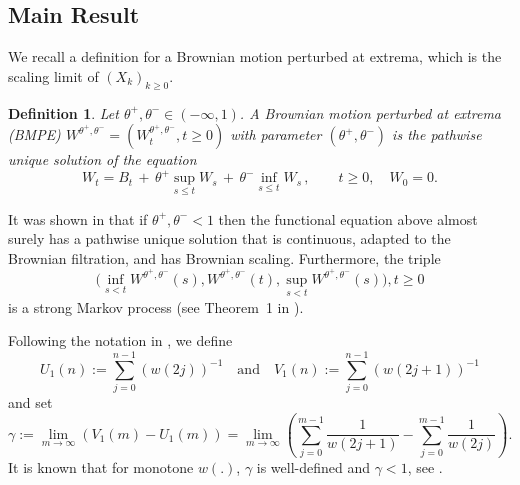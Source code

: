 \documentclass[twoside,12pt, a4paper, final]{article}
\newtheorem{definition}{Definition}[section]
\numberwithin{equation}{section}
\theoremstyle{remark}
\newcommand{\comment}[1]{\textcolor{blue}{(Comment: #1)}}
\begin{document}
	
	
	
	
	\subsection{Main Result}
	We recall a definition for a Brownian motion perturbed at extrema, which is the scaling limit of $(X_k)_{k\geq 0}$.
	\begin{definition}
		\label{defn:BMPE}
		Let $\theta^+, \theta^- \in (- \infty , 1)$. A Brownian motion perturbed at
		extrema (BMPE) $W^{\theta^+, \theta^-} = \left(W^{\theta^+, \theta^-}_t, t\geq 0\right)$ with parameter $(\theta^+, \theta^-)$ is the pathwise unique solution of the equation
		$$
		W_t = B_t \,+\, \theta^+ \sup_{s\leq t} W_s  \,+\, \theta^- \inf_{s\leq t} W_s \,,   \qquad t \ge 0, \quad W_0 = 0.
		$$
	\end{definition}
	It was shown in \cite{PW97, CD99} that if $\theta^+, \theta^- < 1$ then the functional equation above almost surely has a pathwise unique solution that is continuous, adapted to the Brownian filtration, and has Brownian scaling. 
	Furthermore, the triple 
	$${\big(\inf_{s < t} W^{\theta^{+}, \theta^{-}}(s), 
		W^{\theta^{+}, \theta^{-}}(t) , 
		\sup _{s<t} W^{\theta^{+}, \theta^{-}}(s)\big)}, t \geq 0$$ is a strong Markov process (see Theorem~1 in \cite{PW97}).
	
	Following the notation in \cite{T96}, we define
	\[
	U_1(n):=\sum_{j=0}^{n-1}(w(2 j))^{-1} \quad \text{and} \quad
	V_1(n):=\sum_{j=0}^{n-1}(w(2 j+1))^{-1}
	\]
	and set
	\begin{equation}
		\label{eq: gamma}
		\gamma:= \lim_{m\to \infty}\left( V_1(m) - U_1(m) \right) =\lim_{m\to \infty} \left( \sum_{j=0}^{m-1} \frac{1}{ w(2j+1)}-  \sum_{j=0}^{m-1}  \frac{1}{w(2j)} \right) 
		.\end{equation}
	It is known that for monotone $w(.)$, $\gamma$
	is well-defined and ${\gamma<1}$, see \cite{T96}. 
	
\end{document}
